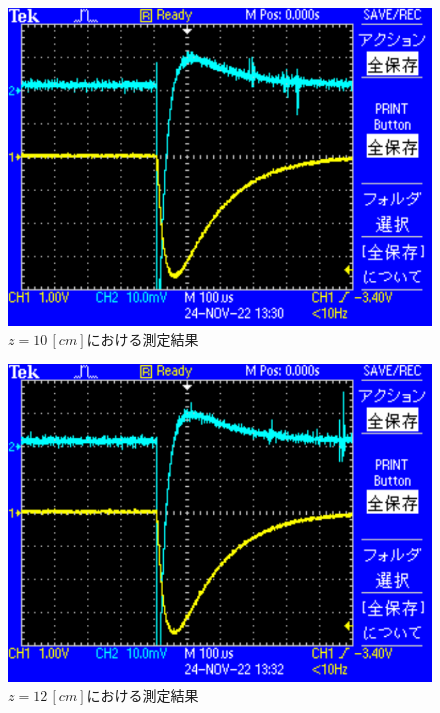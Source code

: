 \begin{figure}[H]
    \centering
    \includegraphics[scale=0.5]{images-6.pdf}
    \caption{$z=10\,[cm]$における測定結果}
\end{figure}

\begin{figure}[H]
    \centering
    \includegraphics[scale=0.5]{images-7.pdf}
    \caption{$z=12\,[cm]$における測定結果}
\end{figure}

